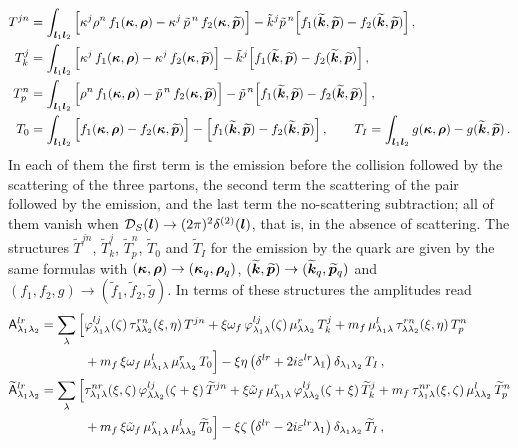 \begin{align}
T^{jn}&=\int_{\bm{l}_1\bm{l}_2}\Big[\kappa^j\rho^n\,f_1(\bm{\kappa},\bm{\rho})-\kappa^j\,\tilde p^{\,n}\,f_2(\bm{\kappa},\widetilde{\bm{p}})\Big]
-\tilde k^j\tilde p^{\,n}\Big[f_1(\widetilde{\bm{k}},\widetilde{\bm{p}})-f_2(\widetilde{\bm{k}},\widetilde{\bm{p}})\Big]\,,
\nonumber\\
T_k^{j}&=\int_{\bm{l}_1\bm{l}_2}\Big[\kappa^j\,f_1(\bm{\kappa},\bm{\rho})-\kappa^j\,f_2(\bm{\kappa},\widetilde{\bm{p}})\Big]
-\tilde k^j\Big[f_1(\widetilde{\bm{k}},\widetilde{\bm{p}})-f_2(\widetilde{\bm{k}},\widetilde{\bm{p}})\Big]\,,
\nonumber\\
T_p^{n}&=\int_{\bm{l}_1\bm{l}_2}\Big[\rho^n\,f_1(\bm{\kappa},\bm{\rho})-\tilde p^{\,n}\,f_2(\bm{\kappa},\widetilde{\bm{p}})\Big]
-\tilde p^{\,n}\Big[f_1(\widetilde{\bm{k}},\widetilde{\bm{p}})-f_2(\widetilde{\bm{k}},\widetilde{\bm{p}})\Big]\,,
\nonumber\\
T_0&=\int_{\bm{l}_1\bm{l}_2}\Big[f_1(\bm{\kappa},\bm{\rho})-f_2(\bm{\kappa},\widetilde{\bm{p}})\Big]-\Big[f_1(\widetilde{\bm{k}},\widetilde{\bm{p}})-f_2(\widetilde{\bm{k}},\widetilde{\bm{p}})\Big]\,,
\qquad
T_I=\int_{\bm{l}_1\bm{l}_2}g(\bm{\kappa},\bm{\rho})-g(\widetilde{\bm{k}},\widetilde{\bm{p}})\,.
\label{eq:T}
\end{align}
In each of them the first term is the emission before the collision followed by the scattering of the
three partons, the second term the scattering of the pair followed by the emission, and the last term
the no-scattering subtraction; all of them vanish when $\mathcal{D}_S(\bm{l})\to(2\pi)^2\delta^{(2)}(\bm{l})$, that is,
in the absence of scattering. The structures $\widetilde T^{jn}$, $\widetilde T_k^j$,
$\widetilde T_p^n$, $\widetilde T_0$ and $\widetilde T_I$ for the emission by the quark are given by the
same formulas with $(\bm{\kappa},\bm{\rho})\to(\bm{\kappa}_q,\bm{\rho}_q)$, $(\widetilde{\bm{k}},\widetilde{\bm{p}})\to(\widetilde{\bm{k}}_q,\widetilde{\bm{p}}_q)$ and
$(f_1,f_2,g)\to(\tilde f_1,\tilde f_2,\tilde g)$. In terms of these structures the amplitudes read
\begin{align}
\mathsf{A}^{lr}_{\lambda_1\lambda_2}=\sum_\lambda\Big[&\varphi^{lj}_{\lambda_1\lambda}(\zeta)\,\tau^{rn}_{\lambda\lambda_2}(\xi,\eta)\,T^{jn}
+\xi\omega_f\,\varphi^{lj}_{\lambda_1\lambda}(\zeta)\,\mu^r_{\lambda\lambda_2}\,T_k^j
+m_f\,\mu^l_{\lambda_1\lambda}\,\tau^{rn}_{\lambda\lambda_2}(\xi,\eta)\,T_p^n
\nonumber\\
&+m_f\,\xi\omega_f\,\mu^l_{\lambda_1\lambda}\,\mu^r_{\lambda\lambda_2}\,T_0\Big]
-\xi\eta\,\big(\delta^{lr}+2i\varepsilon^{lr}\lambda_1\big)\,\delta_{\lambda_1\lambda_2}\,T_I\,,
\nonumber\\
\widetilde{\mathsf{A}}^{lr}_{\lambda_1\lambda_2}=\sum_\lambda\Big[&\tau^{nr}_{\lambda_1\lambda}(\xi,\zeta)\,\varphi^{lj}_{\lambda\lambda_2}(\zeta+\xi)\,\widetilde T^{jn}
+\xi\tilde{\omega}_f\,\mu^r_{\lambda_1\lambda}\,\varphi^{lj}_{\lambda\lambda_2}(\zeta+\xi)\,\widetilde T_k^j
+m_f\,\tau^{nr}_{\lambda_1\lambda}(\xi,\zeta)\,\mu^l_{\lambda\lambda_2}\,\widetilde T_p^n
\nonumber\\
&+m_f\,\xi\tilde{\omega}_f\,\mu^r_{\lambda_1\lambda}\,\mu^l_{\lambda\lambda_2}\,\widetilde T_0\Big]
-\xi\zeta\,\big(\delta^{lr}-2i\varepsilon^{lr}\lambda_1\big)\,\delta_{\lambda_1\lambda_2}\,\widetilde T_I\,,
\label{eq:amp}
\end{align}

